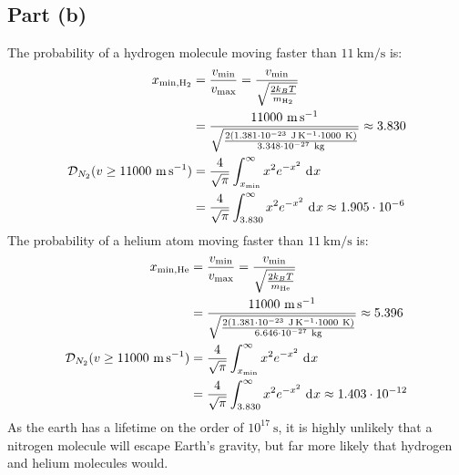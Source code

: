 \documentclass{article}
\begin{document}
\subsection*{Part (b)}
The probability of a hydrogen molecule moving faster than $11~\unit{\kilo\meter\per\second}$ is:
\begin{equation}
    \begin{split}
        x_{\text{min},\ce{H2}} & = \frac{v_{\text{min}}}{v_{\text{max}}} = \frac{v_{\text{min}}}{\sqrt{\frac{2k_BT}{m_{\ce{H2}}}}} \\
        & = \frac{11000~\unit{\meter\per\second}}{\sqrt{\frac{2\left(1.381 \cdot 10^{-23}~\unit{\joule\per\kelvin} \cdot 1000~\unit{\kelvin}\right)}{3.348 \cdot 10^{-27}~\unit{\kilo\gram}}}} \approx 3.830 \\
        \mathcal{D}_{N_2}(v \geq 11000~\unit{\meter\per\second}) & = \frac{4}{\sqrt{\pi}}\int_{x_{\text{min}}}^{\infty} x^2 e^{-x^2} \, \diff{x} \\
        & = \frac{4}{\sqrt{\pi}}\int_{3.830}^{\infty} x^2 e^{-x^2} \, \diff{x} \approx 1.905 \cdot 10^{-6} \\
    \end{split}
\end{equation}
The probability of a helium atom moving faster than $11~\unit{\kilo\meter\per\second}$ is:
\begin{equation}
    \begin{split}
        x_{\text{min},\ce{He}} & = \frac{v_{\text{min}}}{v_{\text{max}}} = \frac{v_{\text{min}}}{\sqrt{\frac{2k_BT}{m_{\ce{He}}}}} \\
        & = \frac{11000~\unit{\meter\per\second}}{\sqrt{\frac{2\left(1.381 \cdot 10^{-23}~\unit{\joule\per\kelvin} \cdot 1000~\unit{\kelvin}\right)}{6.646 \cdot 10^{-27}~\unit{\kilo\gram}}}} \approx 5.396 \\
        \mathcal{D}_{N_2}(v \geq 11000~\unit{\meter\per\second}) & = \frac{4}{\sqrt{\pi}}\int_{x_{\text{min}}}^{\infty} x^2 e^{-x^2} \, \diff{x} \\
        & = \frac{4}{\sqrt{\pi}}\int_{3.830}^{\infty} x^2 e^{-x^2} \, \diff{x} \approx 1.403 \cdot 10^{-12} \\
    \end{split}
\end{equation}
As the earth has a lifetime on the order of $10^{17}~\unit{\second}$, it is highly unlikely that a nitrogen molecule will escape Earth's gravity, but far more likely that hydrogen and helium molecules would.
\end{document}
